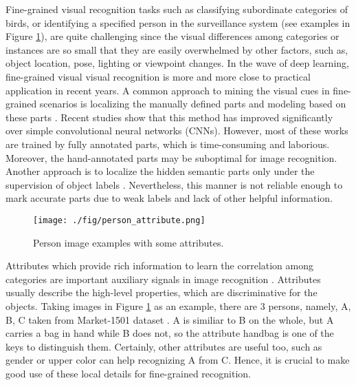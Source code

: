 \documentclass[sigconf]{acmart}
\begin{document}
Fine-grained visual recognition tasks such as classifying subordinate categories of birds, or identifying a specified person in the surveillance system (see examples in Figure \ref{fig:person}), are quite challenging since the visual differences among categories or instances are so small that they are easily overwhelmed by other factors, such as, object location, pose, lighting or viewpoint changes. In the wave of deep learning, fine-grained visual visual recognition is more and more close to practical application in recent years. A common approach to mining the visual cues in fine-grained scenarios is localizing the manually defined parts and modeling based on these parts \cite{huang2016part}. Recent studies show that this method has improved significantly over simple convolutional neural networks (CNNs). However, most of these works are trained by fully annotated parts, which is time-consuming and laborious. Moreover, the hand-annotated parts may be suboptimal for image recognition. Another approach is to localize the hidden semantic parts only under the supervision of object labels \cite{oquab2015object, durand2016weldon}. Nevertheless, this manner is not reliable enough to mark accurate parts due to weak labels and lack of other helpful information.

\begin{figure}[!htp]
\begin{center}
   \texttt{[image: ./fig/person\_attribute.png]}
\end{center}
   \caption{Person image examples with some attributes.}
\label{fig:person}
\end{figure}

Attributes which provide rich information to learn the correlation among categories are important auxiliary signals in image recognition \cite{lampert2009learning,wang2009joint}. Attributes usually describe the high-level properties, which are discriminative for the objects. Taking images in Figure \ref{fig:person} as an example, there are 3 persons, namely, A, B, C taken from Market-1501 dataset \cite{Zheng2015Scalable}. A is similiar to B on the whole, but A carries a bag in hand while B does not, so the attribute handbag is one of the keys to distinguish them. Certainly, other attributes are useful too, such as gender or upper color can help recognizing A from C. Hence, it is crucial to make good use of these local details for fine-grained recognition.
\end{document}
